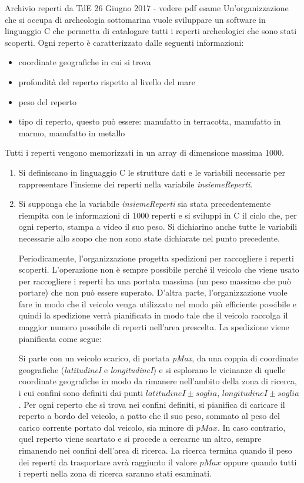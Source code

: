 \documentclass[format=169, handout]{beamer}
\begin{document}
\begin{frame}[allowframebreaks]{Archivio reperti da TdE 26 Giugno 2017 - vedere pdf esame}
Un’organizzazione che si occupa di archeologia sottomarina vuole sviluppare un software in linguaggio C
che permetta di catalogare tutti i reperti archeologici che sono stati scoperti. Ogni reperto è caratterizzato
dalle seguenti informazioni:
\begin{itemize}
\item coordinate geografiche in cui si trova
\item profondità del reperto rispetto al livello del mare
\item  peso del reperto
\item  tipo di reperto, questo può essere: manufatto in terracotta, manufatto in marmo, manufatto in metallo
\end{itemize}
Tutti i reperti vengono memorizzati in un array di dimensione massima 1000.

\begin{enumerate}
\item Si definiscano in linguaggio C le strutture dati e le variabili necessarie per rappresentare l’insieme dei
reperti nella variabile \emph{insiemeReperti}.
\item  Si supponga che la variabile \emph{insiemeReperti} sia stata precedentemente riempita con le informazioni
di 1000 reperti e si sviluppi in C il ciclo che, per ogni reperto, stampa a video il suo peso. Si dichiarino
anche tutte le variabili necessarie allo scopo che non sono state dichiarate nel punto precedente.

Periodicamente, l’organizzazione progetta spedizioni per raccogliere i reperti scoperti. L’operazione non è
sempre possibile perché il veicolo che viene usato per raccogliere i reperti ha una portata massima (un peso
massimo che può portare) che non può essere superato. D’altra parte, l’organizzazione vuole fare in modo
che il veicolo venga utilizzato nel modo più efficiente possibile e quindi la spedizione verrà pianificata in
modo tale che il veicolo raccolga il maggior numero possibile di reperti nell'area prescelta. La spedizione
viene pianificata come segue:

Si parte con un veicolo scarico, di portata \emph{pMax}, da una coppia di coordinate geografiche (\emph{latitudineI}
e \emph{longitudineI}) e si esplorano le vicinanze di quelle coordinate geografiche in modo da rimanere
nell'ambito della zona di ricerca, i cui confini sono definiti dai punti $latitudineI ± soglia$,
$longitudineI ± soglia$. Per ogni reperto che si trova nei confini definiti, si pianifica di caricare il
reperto a bordo del veicolo, a patto che il suo peso, sommato al peso del carico corrente portato dal veicolo,
sia minore di $pMax$. In caso contrario, quel reperto viene scartato e si procede a cercarne un altro, sempre
rimanendo nei confini dell'area di ricerca. La ricerca termina quando il peso dei reperti da trasportare avrà
raggiunto il valore $pMax$ oppure quando tutti i reperti nella zona di ricerca saranno stati esaminati.


\end{enumerate}
\end{frame}
\end{document}
